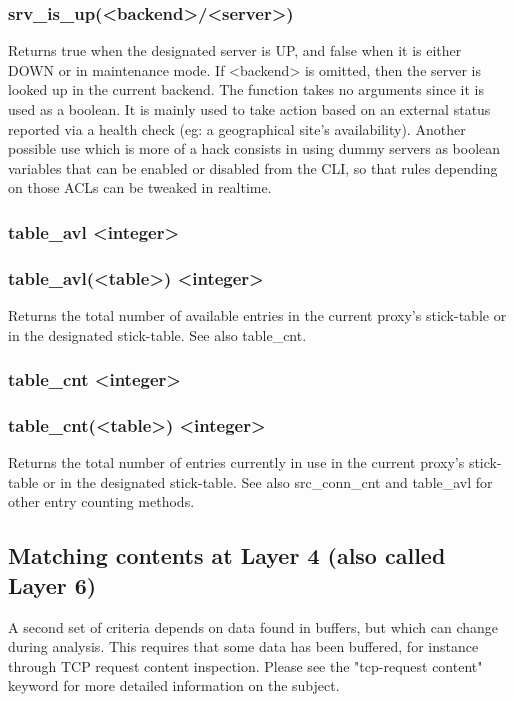 \subsubsection*{srv\_is\_up(<backend>/<server>)}
  Returns true when the designated server is UP, and false when it is either
  DOWN or in maintenance mode. If <backend> is omitted, then the server is
  looked up in the current backend. The function takes no arguments since it
  is used as a boolean. It is mainly used to take action based on an external
  status reported via a health check (eg: a geographical site's availability).
  Another possible use which is more of a hack consists in using dummy servers
  as boolean variables that can be enabled or disabled from the CLI, so that
  rules depending on those ACLs can be tweaked in realtime.

\subsubsection[table\_avl]{table\_avl <integer>}
\subsubsection*{table\_avl(<table>) <integer>}
  Returns the total number of available entries in the current proxy's
  stick-table or in the designated stick-table. See also table\_cnt.

\subsubsection[table\_cnt]{table\_cnt <integer>}
\subsubsection*{table\_cnt(<table>) <integer>}
  Returns the total number of entries currently in use in the current proxy's
  stick-table or in the designated stick-table. See also src\_conn\_cnt and
  table\_avl for other entry counting methods.

\subsection{Matching contents at Layer 4 (also called Layer 6)}

A second set of criteria depends on data found in buffers, but which can change
during analysis. This requires that some data has been buffered, for instance
through TCP request content inspection. Please see the "tcp-request content"
keyword for more detailed information on the subject.

